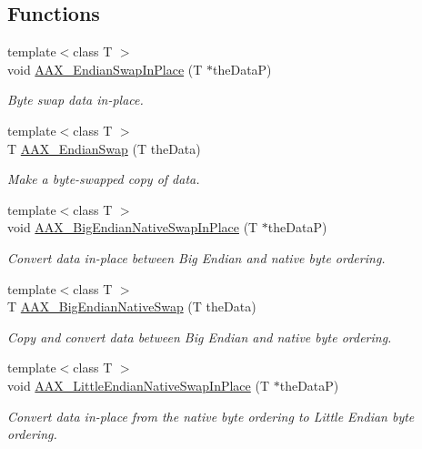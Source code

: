 \subsection*{Functions}
\begin{DoxyCompactItemize}
\item 
{\footnotesize template$<$class T $>$ }\\void \mbox{\hyperlink{a00488_a121ee6a20eb996039b0f187db0a2cc8e}{A\+A\+X\+\_\+\+Endian\+Swap\+In\+Place}} (T $\ast$the\+DataP)
\begin{DoxyCompactList}\small\item\em Byte swap data in-\/place. \end{DoxyCompactList}\item 
{\footnotesize template$<$class T $>$ }\\T \mbox{\hyperlink{a00488_a5caa5e68dec3f028697b64ad04f0cb5c}{A\+A\+X\+\_\+\+Endian\+Swap}} (T the\+Data)
\begin{DoxyCompactList}\small\item\em Make a byte-\/swapped copy of data. \end{DoxyCompactList}\item 
{\footnotesize template$<$class T $>$ }\\void \mbox{\hyperlink{a00488_a2aa4dc892c77aa0ed29e84a5f29c9538}{A\+A\+X\+\_\+\+Big\+Endian\+Native\+Swap\+In\+Place}} (T $\ast$the\+DataP)
\begin{DoxyCompactList}\small\item\em Convert data in-\/place between Big Endian and native byte ordering. \end{DoxyCompactList}\item 
{\footnotesize template$<$class T $>$ }\\T \mbox{\hyperlink{a00488_a7387790d73eed6c54af682c7afd9e463}{A\+A\+X\+\_\+\+Big\+Endian\+Native\+Swap}} (T the\+Data)
\begin{DoxyCompactList}\small\item\em Copy and convert data between Big Endian and native byte ordering. \end{DoxyCompactList}\item 
{\footnotesize template$<$class T $>$ }\\void \mbox{\hyperlink{a00488_af4164bdfb3807edcd582e0289a6ed59a}{A\+A\+X\+\_\+\+Little\+Endian\+Native\+Swap\+In\+Place}} (T $\ast$the\+DataP)
\begin{DoxyCompactList}\small\item\em Convert data in-\/place from the native byte ordering to Little Endian byte ordering. \end{DoxyCompactList}\item 

\end{DoxyCompactItemize}
